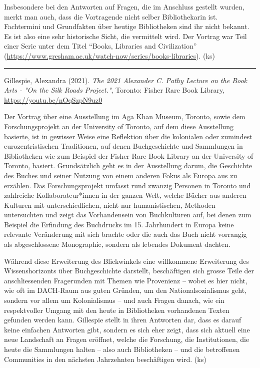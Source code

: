 \documentclass[a4paper,
fontsize=11pt,
oneside,
numbers=noperiodatend,
parskip=half-,
bibliography=totoc,
final
]{scrartcl}
\begin{document}
Insbesondere bei den Antworten auf Fragen, die im Anschluss gestellt
wurden, merkt man auch, dass die Vortragende nicht selber Bibliothekarin
ist. Fachtermini und Grundfakten über heutige Bibliotheken sind ihr
nicht bekannt. Es ist also eine sehr historische Sicht, die vermittelt
wird. Der Vortrag war Teil einer Serie unter dem Titel \enquote{Books,
Libraries and Civilization}
(\url{https://www.gresham.ac.uk/watch-now/series/books-libraries}). (ks)

\begin{center}\rule{0.5\linewidth}{0.5pt}\end{center}

Gillespie, Alexandra (2021). \emph{The 2021 Alexander C. Pathy Lecture
on the Book Arts - "On the Silk Roads Project."}, Toronto: Fisher Rare
Book Library, \url{https://youtu.be/nOqSzpN9uz0}

Der Vortrag über eine Ausstellung im Aga Khan Museum, Toronto, sowie dem
Forschungsprojekt an der University of Toronto, auf dem diese
Ausstellung basierte, ist in gewisser Weise eine Reflektion über die
kolonialen oder zumindest eurozentristischen Traditionen, auf denen
Buchgeschichte und Sammlungen in Bibliotheken wie zum Beispiel der
Fisher Rare Book Library an der University of Toronto, basiert.
Grundsätzlich geht es in der Ausstellung darum, die Geschichte des
Buches und seiner Nutzung von einem anderen Fokus als Europa aus zu
erzählen. Das Forschungsprojekt umfasst rund zwanzig Personen in Toronto
und zahlreiche Kollaborateur*innen in der ganzen Welt, welche Bücher aus
anderen Kulturen mit unterschiedlichen, nicht nur humanistischen,
Methoden untersuchten und zeigt das Vorhandensein von Buchkulturen auf,
bei denen zum Beispiel die Erfindung des Buchdrucks im 15. Jahrhundert
in Europa keine relevante Veränderung mit sich brachte oder die auch das
Buch nicht vorrangig als abgeschlossene Monographie, sondern als
lebendes Dokument dachten.

Während diese Erweiterung des Blickwinkels eine willkommene Erweiterung
des Wissenshorizonts über Buchgeschichte darstellt, beschäftigen sich
grosse Teile der anschliessenden Fragerunden mit Themen wie Provenienz
-- wobei es hier nicht, wie oft im DACH-Raum aus guten Gründen, um den
Nationalsozialismus geht, sondern vor allem um Kolonialismus -- und auch
Fragen danach, wie ein respektvoller Umgang mit den heute in
Bibliotheken vorhandenen Texten gefunden werden kann. Gillespie stellt
in ihren Antworten dar, dass es darauf keine einfachen Antworten gibt,
sondern es sich eher zeigt, dass sich aktuell eine neue Landschaft an
Fragen eröffnet, welche die Forschung, die Institutionen, die heute die
Sammlungen halten -- also auch Bibliotheken -- und die betroffenen
Communities in den nächsten Jahrzehnten beschäftigen wird. (ks)
\end{document}
